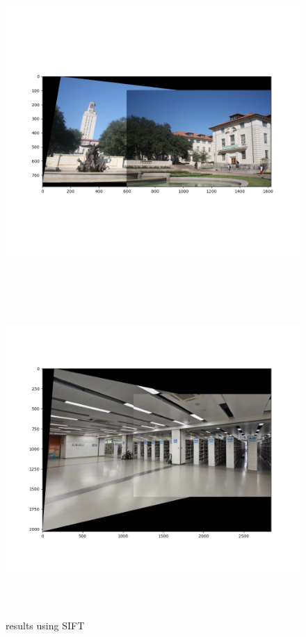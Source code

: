 \documentclass[a4paper,UTF8]{article}
\numberwithin{equation}{section}
\begin{document}
\begin{figure}[H]
	\centering  %
	\includegraphics[width=12cm,height=12cm]{result_auto1.png}  %
	\includegraphics[width=12cm,height=12cm]{result_auto2.png}  %
	\caption{results using SIFT}  %
\end{figure}
\end{document}
